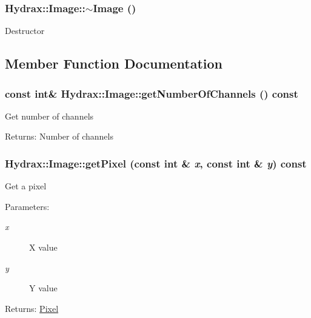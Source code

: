 \begin{CompactItemize}
{\subsubsection[{$\sim$Image}]{\setlength{\rightskip}{0pt plus 5cm}Hydrax::Image::$\sim$Image ()}}
\label{class_hydrax_1_1_image_326c283842e93944fabea025b26a50f7}


Destructor 

\subsection{Member Function Documentation}
\hypertarget{class_hydrax_1_1_image_f11bfbc9071c67c038dd0835628908f2}{
\subsubsection[{getNumberOfChannels}]{\setlength{\rightskip}{0pt plus 5cm}const int\& Hydrax::Image::getNumberOfChannels () const}}
\label{class_hydrax_1_1_image_f11bfbc9071c67c038dd0835628908f2}


Get number of channels \begin{Desc}
\item[Returns:]Number of channels \end{Desc}
\hypertarget{class_hydrax_1_1_image_866bdef55697fe70add44705d5e076ab}{
\subsubsection[{getPixel}]{ Hydrax::Image::getPixel (const int \& {\em x}, \/  const int \& {\em y}) const}}
\label{class_hydrax_1_1_image_866bdef55697fe70add44705d5e076ab}


Get a pixel \begin{Desc}
\item[Parameters:]
\begin{description}
\item[{\em x}]X value \item[{\em y}]Y value \end{description}
\end{Desc}
\begin{Desc}
\item[Returns:]\hyperlink{struct_hydrax_1_1_image_1_1_pixel}{Pixel} \end{Desc}
\hypertarget{class_hydrax_1_1_image_433e71c1e9630bbaddbcef5795f50bfa}{
}
\end{CompactItemize}
